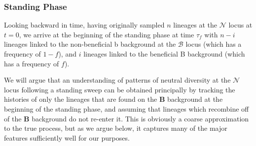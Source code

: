 \documentclass[a4paper,10pt]{article}
\newcommand{\fancyN}{$\mathcal N$ }
\newcommand{\fancyB}{$\mathcal B$ }
\begin{document}



\subsubsection{Standing Phase}
Looking backward in time, having originally sampled $n$ lineages at the \fancyN locus at $t=0$, we arrive at the beginning of the standing phase at time $\tau_{f}$ with $n-i$ lineages linked to the non-beneficial b background at the \fancyB locus (which has a frequency of $1-f$), and $i$ lineages linked to the beneficial B background (which has a frequency of $f$). 



We will argue that an understanding of patterns of neutral diversity at the \fancyN locus following a standing sweep can be obtained principally by tracking the histories of only the lineages that are found on the \textbf{B} background at the beginning of the standing phase, and assuming that lineages which recombine off of the \textbf{B} background do not re-enter it. This is obviously a coarse approximation to the true process, but as we argue below, it captures many of the major features sufficiently well for our purposes.


\end{document}
